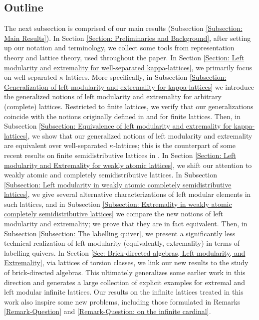 \documentclass{amsart}
\theoremstyle{thmstyle}
\theoremstyle{exstyle}
\theoremstyle{defstyle}
\theoremstyle{remstyle}
\theoremstyle{remstyle}
\begin{document}
\subsection{Outline} The next subsection is comprised of our main results (Subsection \ref{Subsection: Main Results}). 
In Section \ref{Section: Preliminaries and Background}, after setting up our notation and terminology, we collect some tools from representation theory and lattice theory, used throughout the paper. 
In Section \ref{Section: Left modularity and extremality for well-separated kappa-lattices}, we primarily focus on well-separated $\kappa$-lattices. 
More specifically, in Subsection \ref{Subsection: Generalization of left modularity and extremality for kappa-lattices} we introduce the generalized notions of left modularity and extremality for arbitrary (complete) lattices. Restricted to finite lattices, we verify that our generalizations coincide with the notions originally defined in \cite{LS} and \cite{Mu} for finite lattices. 
Then, in Subsection \ref{Subsection: Equivalence of left modularity and extremality for kappa-lattices}, we show that our generalized notions of left modularity and extremality are equivalent over well-separated $\kappa$-lattices; this is the counterpart of some recent results on finite semidistributive lattices in \cite{Mu, TW}. 
In Section \ref{Section: Left modularity and Extremality for weakly atomic lattices}, we shift our attention to weakly atomic and completely semidistributive lattices. 
In Subsection \ref{Subsection: Left modularity in weakly atomic completely semidistributive lattices}, we give several alternative characterizations of left modular elements in such lattices, and in Subsection \ref{Subsection: Extremality in weakly atomic completely semidistributive lattices} we compare the new notions of left modularity and extremality; we prove that they are in fact equivalent. 
Then, in Subsection \ref{Subsection: The labelling quiver}, we present a significantly less technical realization of left modularity (equivalently, extremality) in terms of labelling quivers. 
In Section \ref{Sec: Brick-directed algebras, Left modularity, and Extremality}, via lattices of torsion classes, we link our new results to the study of brick-directed algebras. This ultimately generalizes some earlier work in this direction and generates a large collection of explicit examples for extremal and left modular infinite lattices.
Our results on the infinite lattices treated in this work also inspire some new problems, including those formulated in Remarks \ref{Remark-Question} and \ref{Remark-Question: on the infinite cardinal}. 
\end{document}
